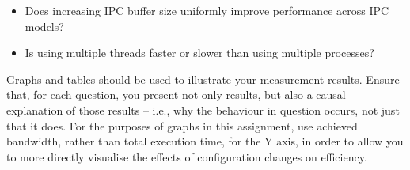 \documentclass[a4paper,10pt]{article}
\begin{document}
\begin{itemize}
  \item Does increasing IPC buffer size uniformly improve performance across
    IPC models?
  \item Is using multiple threads faster or slower than using multiple
    processes?
\end{itemize}

\noindent
Graphs and tables should be used to illustrate your measurement results.
Ensure that, for each question, you present not only results, but also a
causal explanation of those results -- i.e., why the behaviour in question
occurs, not just that it does.
For the purposes of graphs in this assignment, use achieved bandwidth, rather
than total execution time, for the Y axis, in order to allow you to more
directly visualise the effects of configuration changes on efficiency.
\end{document}
